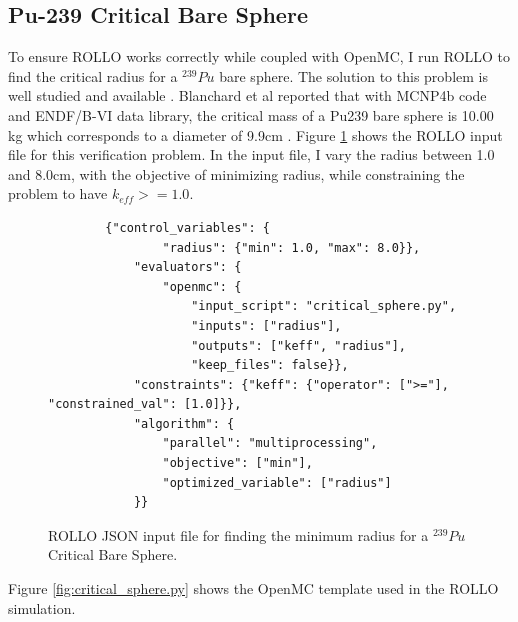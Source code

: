 \subsection{Pu-239 Critical Bare Sphere}
To ensure \gls{ROLLO} works correctly while coupled with OpenMC, I run \gls{ROLLO} 
to find the critical radius for a $^{239}Pu$ bare sphere. 
The solution to this problem is well studied and available \cite{blanchard_updated_1999}. 
Blanchard et al reported that with MCNP4b code and ENDF/B-VI data library, the 
critical mass of a Pu239 bare sphere is 10.00 kg which corresponds to a diameter 
of 9.9cm \cite{blanchard_updated_1999}.
Figure \ref{fig:verification-sphere} shows the ROLLO input file for this verification 
problem. 
In the input file, I vary the radius between 1.0 and 8.0cm, with the objective of 
minimizing radius, while constraining the problem to have $k_{eff} >= 1.0$.
\begin{figure}[H]
    \begin{verbatim}
        {"control_variables": {
                "radius": {"min": 1.0, "max": 8.0}},
            "evaluators": {
                "openmc": {
                    "input_script": "critical_sphere.py",
                    "inputs": ["radius"],
                    "outputs": ["keff", "radius"],
                    "keep_files": false}},
            "constraints": {"keff": {"operator": [">="], "constrained_val": [1.0]}},
            "algorithm": {
                "parallel": "multiprocessing",
                "objective": ["min"],
                "optimized_variable": ["radius"]
            }}
    \end{verbatim}
    \caption{\acrfull{ROLLO} JSON input file for finding the minimum radius for 
    a $^{239}Pu$ Critical Bare Sphere.}
    \label{fig:verification-sphere}
\end{figure}
\pagebreak
Figure \ref{fig:critical_sphere.py} shows the OpenMC template used in the 
\gls{ROLLO} simulation. 
